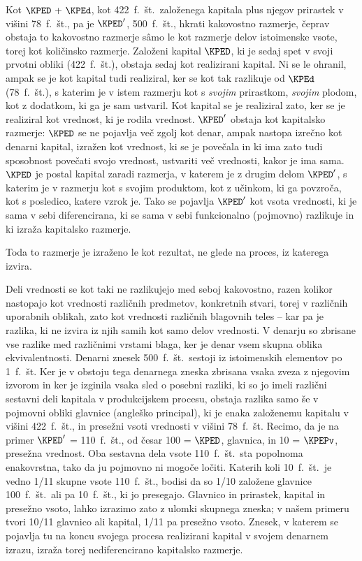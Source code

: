 \documentclass[kapital_02.tex]{subfiles}
\begin{document}
Kot \(\KPED \textrm{ + } \KPEd\), kot 422\ f.\ št.\ založenega kapitala plus njegov prirastek v višini 78\ f.\ št., pa je \(\KPED'\), 500\ f.\ št., hkrati kakovostno razmerje, čeprav obstaja to kakovostno razmerje s\^amo le kot razmerje delov istoimenske vsote, torej kot količinsko razmerje. Založeni kapital \(\KPED\), ki je sedaj spet v svoji prvotni obliki (422\ f.\ št.), obstaja sedaj kot realizirani kapital. Ni se le ohranil, ampak se je kot kapital tudi realiziral, ker se kot tak razlikuje od \(\KPEd\) (78\ f.\ št.), s katerim je v istem razmerju kot s \emph{svojim} prirastkom, \emph{svojim} plodom, kot z dodatkom, ki ga je sam ustvaril. Kot kapital se je realiziral zato, ker se je realiziral kot vrednost, ki je rodila vrednost. \(\KPED'\) obstaja kot kapitalsko razmerje: \(\KPED\) se ne pojavlja več zgolj kot denar, ampak nastopa izrečno kot denarni kapital, izražen kot vrednost, ki se je povečala in ki ima zato tudi sposobnost povečati svojo vrednost, ustvariti več vrednosti, kakor je ima sama. \(\KPED\) je postal kapital zaradi razmerja, v katerem je z drugim delom \(\KPED'\), s katerim je v razmerju kot s svojim produktom, kot z učinkom, ki ga povzroča, kot s posledico, katere vzrok je. Tako se pojavlja \(\KPED'\) kot vsota vrednosti, ki je sama v sebi diferencirana, ki se sama v sebi funkcionalno (pojmovno) razlikuje in ki izraža kapitalsko razmerje.

Toda to razmerje je izraženo le kot rezultat, ne glede na proces, iz katerega izvira.

Deli vrednosti se kot taki ne razlikujejo med seboj kakovostno, razen kolikor nastopajo kot vrednosti različnih predmetov, konkretnih stvari, torej v različnih uporabnih oblikah, zato kot vrednosti različnih blagovnih teles -- kar pa je razlika, ki ne izvira iz njih samih kot samo delov vrednosti. V denarju so zbrisane vse razlike med različnimi vrstami blaga, ker je denar vsem skupna oblika ekvivalentnosti. Denarni \KPEstran znesek 500\ f.\ št.\ sestoji iz istoimenskih elementov po 1\ f.\ št. Ker je v obstoju tega denarnega zneska zbrisana vsaka zveza z njegovim izvorom in ker je izginila vsaka sled o posebni razliki, ki so jo imeli različni sestavni deli kapitala v produkcijskem procesu, obstaja razlika samo še v pojmovni obliki glavnice (angleško principal), ki je enaka založenemu kapitalu v višini 422\ f.\ št., in presežni vsoti vrednosti v višini 78\ f.\ št. Recimo, da je na primer \(\KPED'\) = 110\ f.\ št., od česar 100 = \(\KPED\), glavnica, in 10 = \(\KPEPv\), presežna vrednost. Oba sestavna dela vsote 110\ f.\ št.\ sta popolnoma enakovrstna, tako da ju pojmovno ni mogoče ločiti. Katerih koli 10\ f.\ št.\ je vedno 1/11 skupne vsote 110\ f.\ št., bodisi da so 1/10 založene glavnice 100\ f.\ št.\ ali pa 10\ f.\ št., ki jo presegajo. Glavnico in prirastek, kapital in presežno vsoto, lahko izrazimo zato z ulomki skupnega zneska; v našem primeru tvori 10/11 glavnico ali kapital, 1/11 pa presežno vsoto. Znesek, v katerem se pojavlja tu na koncu svojega procesa realizirani kapital v svojem denarnem izrazu, izraža torej nediferencirano kapitalsko razmerje.
\end{document}
